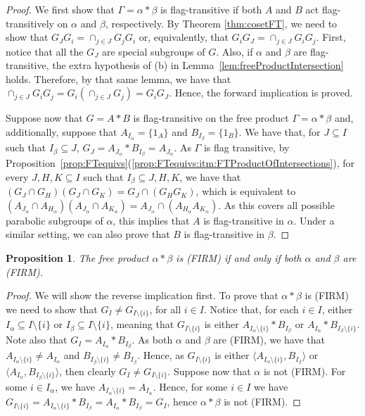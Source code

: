 \documentclass[11pt,letterpaper]{amsart}
\newtheorem{prop}{Proposition}[section]
\begin{document}
\begin{proof}
    We first show that $\Gamma = \alpha*\beta$ is flag-transitive if both $A$ and $B$ act flag-transitively on $\alpha$ and $\beta$, respectively. By Theorem \ref{thm:cosetFT}, we need to show that $G_JG_i = \cap_{j\in J} G_jG_i$ or, equivalently, that $G_iG_J = \cap_{j \in J} G_iG_j$. 
    First, notice that all the $G_J$ are special subgroups of $G$. Also, if $\alpha$ and $\beta$ are flag-transitive, the extra hypothesis of (b) in Lemma~\ref{lem:freeProductIntersection} holds. Therefore, by that same lemma, we have that $\cap_{j \in J} G_iG_j = G_i (\cap_{j \in J} G_j) = G_iG_J$. Hence, the forward implication is proved.

    
    Suppose now that $G=A*B$ is flag-transitive on the free product $\Gamma=\alpha*\beta$ and, additionally, suppose that $A_{I_\alpha}=\{1_A\}$ and $B_{I_\beta}=\{1_B\}$. 
    We have that, for $J\subseteq I$ such that $I_\beta \subseteq J$, $G_{J}= A_{J_\alpha}*B_{I_\beta} = A_{J_\alpha}$. As $\Gamma$ is flag transitive, by Proposition~\ref{prop:FTequivs}(\ref{prop:FTequivs:itm:FTProductOfIntersections}), for every $J,H,K\subseteq I$ such that $I_\beta\subseteq J,H,K$, we have that $(G_J\cap G_H)(G_J\cap G_K)= G_J\cap (G_H G_K)$, which is equivalent to $(A_{J_\alpha}\cap A_{H_\alpha})(A_{J_\alpha}\cap A_{K_\alpha})= A_{J_\alpha}\cap (A_{H_\alpha} A_{K_\alpha})$. As this covers all possible parabolic subgroups of $\alpha$, this implies that $A$ is flag-transitive in $\alpha$. Under a similar setting, we can also prove that $B$ is flag-transitive in $\beta$. 
\end{proof}

\begin{prop}\label{prop:FIRM_free}
The free product $\alpha * \beta$ is (FIRM) if and only if both $\alpha$ and $\beta$ are (FIRM).
\end{prop}
\begin{proof}
        We will show the reverse implication first. To prove that $\alpha * \beta$ is (FIRM) we need to show that $G_I\neq G_{I\setminus\{i\}}$, for all $i\in I$. Notice that, for each $i\in I$, either $I_\alpha\subseteq I\setminus\{i\}$ or $I_\beta\subseteq I\setminus\{i\}$, meaning that $G_{I\setminus\{i\}}$ is either $A_{I_\alpha\setminus\{i\}}*B_{I_\beta}$ or $A_{I_\alpha} * B_{I_\beta\setminus\{i\}}$. Note also that $G_I = A_{I_\alpha} * B_{I_\beta}$. As both $\alpha$ and $\beta$ are (FIRM), we have that $A_{I_\alpha\setminus\{i\}}\neq A_{I_\alpha}$ and $B_{I_\beta\setminus\{i\}}\neq B_{I_\beta}$. Hence, as $G_{I\setminus\{i\}}$ is either $\langle A_{I_\alpha\setminus\{i\}},B_{I_\beta}\rangle$ or 
        $\langle A_{I_\alpha}, B_{I_\beta\setminus\{i\}}\rangle$, then clearly
        $G_I\neq G_{I\setminus\{i\}}$.
    Suppose now that $\alpha$ is not (FIRM). For some $i\in I_{\alpha}$, we have $A_{I_\alpha\setminus\{i\}} = A_{I_\alpha}$. Hence, for some $i\in I$ we have 
    $G_{I\setminus\{i\}} = A_{I_\alpha\setminus\{i\}}* B_{I_\beta} = A_{I_\alpha} * B_{I_\beta}  = G_I$, hence $\alpha * \beta$ is not (FIRM).
\end{proof}
\end{document}
